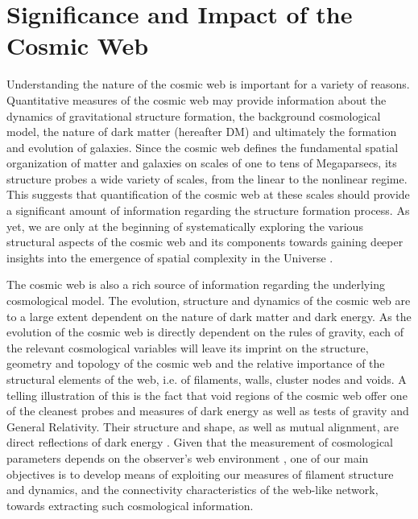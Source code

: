 \section{Significance and Impact of the Cosmic Web}
Understanding the nature of the cosmic web is important for a variety of reasons. Quantitative measures of the cosmic web 
may provide information about the dynamics of gravitational structure formation, the background cosmological model, the 
nature of dark matter (hereafter DM) and ultimately the formation and evolution of galaxies. Since the cosmic web defines the fundamental spatial organization of matter and galaxies on scales of one to tens of Megaparsecs, its structure probes a wide variety of scales, from the linear to the nonlinear regime. This suggests that quantification of the cosmic web at these scales should provide a significant amount of 
information regarding the structure formation process. As yet, we are only at the beginning of systematically exploring the various 
structural aspects of the cosmic web and its components towards gaining deeper insights into the emergence of spatial 
complexity in the Universe \citep[see e.g.][]{Cautun2014a}. 

The cosmic web is also a rich source of information regarding the underlying cosmological model. The evolution, structure and dynamics of the 
cosmic web are to a large extent dependent on the nature of dark matter and dark energy. As the evolution of the cosmic web 
is directly dependent on the rules of gravity, each of the relevant cosmological variables will leave its imprint on the 
structure, geometry and topology of the cosmic web and the relative importance of the structural elements of the 
web, i.e. of filaments, walls, cluster nodes and voids. A telling illustration of this is the fact that  void regions of the cosmic web offer one of the cleanest probes and measures of dark energy as well as tests of gravity and General Relativity. Their structure and shape, as well as mutual alignment, are direct 
reflections of dark energy \citep{Park2007,Platen2008a,Lavaux2010,Lavaux2012,Bos2012,Sutter2014a,Pisani2015}. Given that the measurement of cosmological parameters depends on the observer's web environment \citep[e.g.][]{Wojtak2014}, one of our 
main objectives is to develop means of exploiting our measures of filament structure and dynamics, and the connectivity 
characteristics of the web-like network, towards extracting such cosmological information. 


